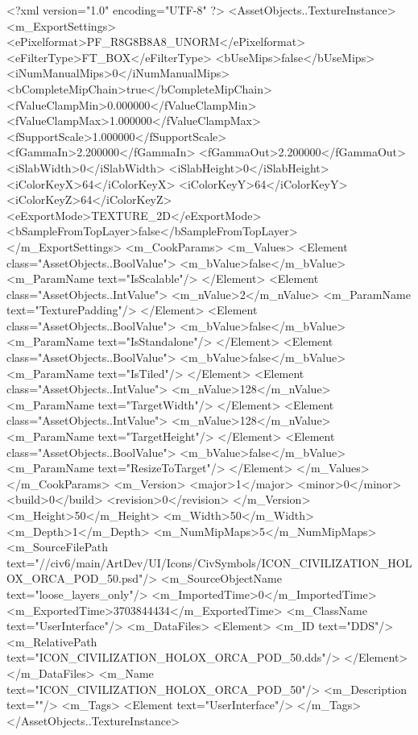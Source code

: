 <?xml version="1.0" encoding="UTF-8" ?>
<AssetObjects..TextureInstance>
	<m_ExportSettings>
		<ePixelformat>PF_R8G8B8A8_UNORM</ePixelformat>
		<eFilterType>FT_BOX</eFilterType>
		<bUseMips>false</bUseMips>
		<iNumManualMips>0</iNumManualMips>
		<bCompleteMipChain>true</bCompleteMipChain>
		<fValueClampMin>0.000000</fValueClampMin>
		<fValueClampMax>1.000000</fValueClampMax>
		<fSupportScale>1.000000</fSupportScale>
		<fGammaIn>2.200000</fGammaIn>
		<fGammaOut>2.200000</fGammaOut>
		<iSlabWidth>0</iSlabWidth>
		<iSlabHeight>0</iSlabHeight>
		<iColorKeyX>64</iColorKeyX>
		<iColorKeyY>64</iColorKeyY>
		<iColorKeyZ>64</iColorKeyZ>
		<eExportMode>TEXTURE_2D</eExportMode>
		<bSampleFromTopLayer>false</bSampleFromTopLayer>
	</m_ExportSettings>
	<m_CookParams>
		<m_Values>
			<Element class="AssetObjects..BoolValue">
				<m_bValue>false</m_bValue>
				<m_ParamName text="IsScalable"/>
			</Element>
			<Element class="AssetObjects..IntValue">
				<m_nValue>2</m_nValue>
				<m_ParamName text="TexturePadding"/>
			</Element>
			<Element class="AssetObjects..BoolValue">
				<m_bValue>false</m_bValue>
				<m_ParamName text="IsStandalone"/>
			</Element>
			<Element class="AssetObjects..BoolValue">
				<m_bValue>false</m_bValue>
				<m_ParamName text="IsTiled"/>
			</Element>
			<Element class="AssetObjects..IntValue">
				<m_nValue>128</m_nValue>
				<m_ParamName text="TargetWidth"/>
			</Element>
			<Element class="AssetObjects..IntValue">
				<m_nValue>128</m_nValue>
				<m_ParamName text="TargetHeight"/>
			</Element>
			<Element class="AssetObjects..BoolValue">
				<m_bValue>false</m_bValue>
				<m_ParamName text="ResizeToTarget"/>
			</Element>
		</m_Values>
	</m_CookParams>
	<m_Version>
		<major>1</major>
		<minor>0</minor>
		<build>0</build>
		<revision>0</revision>
	</m_Version>
	<m_Height>50</m_Height>
	<m_Width>50</m_Width>
	<m_Depth>1</m_Depth>
	<m_NumMipMaps>5</m_NumMipMaps>
	<m_SourceFilePath text="//civ6/main/ArtDev/UI/Icons/CivSymbols/ICON_CIVILIZATION_HOLOX_ORCA_POD_50.psd"/>
	<m_SourceObjectName text="loose_layers_only"/>
	<m_ImportedTime>0</m_ImportedTime>
	<m_ExportedTime>3703844434</m_ExportedTime>
	<m_ClassName text="UserInterface"/>
	<m_DataFiles>
		<Element>
			<m_ID text="DDS"/>
			<m_RelativePath text="ICON_CIVILIZATION_HOLOX_ORCA_POD_50.dds"/>
		</Element>
	</m_DataFiles>
	<m_Name text="ICON_CIVILIZATION_HOLOX_ORCA_POD_50"/>
	<m_Description text=""/>
	<m_Tags>
		<Element text="UserInterface"/>
	</m_Tags>
</AssetObjects..TextureInstance>

